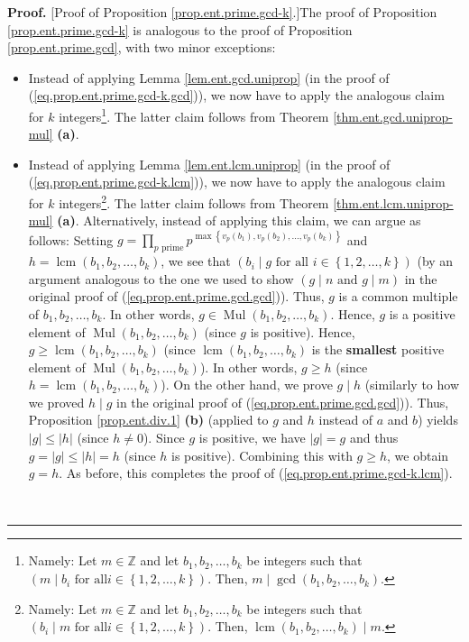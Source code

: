 \documentclass[numbers=enddot,12pt,final,onecolumn,notitlepage]{scrartcl}%
\numberwithin{exer}{subsection}
\theoremstyle{definition}
\newenvironment{proof}[1][Proof]{\noindent\textbf{#1.} }{\ \rule{0.5em}{0.5em}}
\let\prodnonlimits\prod
\renewcommand{\prod}{\prodnonlimits\limits}
\begin{document}
\begin{proof}
[Proof of Proposition \ref{prop.ent.prime.gcd-k}.]The proof of Proposition
\ref{prop.ent.prime.gcd-k} is analogous to the proof of Proposition
\ref{prop.ent.prime.gcd}, with two minor exceptions:

\begin{itemize}
\item Instead of applying Lemma \ref{lem.ent.gcd.uniprop} (in the proof of
(\ref{eq.prop.ent.prime.gcd-k.gcd})), we now have to apply the analogous claim
for $k$ integers\footnote{Namely: Let $m\in\mathbb{Z}$ and let $b_{1}%
,b_{2},\ldots,b_{k}$ be integers such that $\left(  m\mid b_{i}\text{ for all
}i\in\left\{  1,2,\ldots,k\right\}  \right)  $. Then, $m\mid\gcd\left(
b_{1},b_{2},\ldots,b_{k}\right)  $.}. The latter claim follows from Theorem
\ref{thm.ent.gcd.uniprop-mul} \textbf{(a)}.

\item Instead of applying Lemma \ref{lem.ent.lcm.uniprop} (in the proof of
(\ref{eq.prop.ent.prime.gcd-k.lcm})), we now have to apply the analogous claim
for $k$ integers\footnote{Namely: Let $m\in\mathbb{Z}$ and let $b_{1}%
,b_{2},\ldots,b_{k}$ be integers such that $\left(  b_{i}\mid m\text{ for all
}i\in\left\{  1,2,\ldots,k\right\}  \right)  $. Then, $\operatorname{lcm}%
\left(  b_{1},b_{2},\ldots,b_{k}\right)  \mid m$.}. The latter claim follows
from Theorem \ref{thm.ent.lcm.uniprop-mul} \textbf{(a)}. Alternatively,
instead of applying this claim, we can argue as follows: Setting
$g=\prod_{p\text{ prime}}p^{\max\left\{  v_{p}\left(  b_{1}\right)
,v_{p}\left(  b_{2}\right)  ,\ldots,v_{p}\left(  b_{k}\right)  \right\}  }$
and $h=\operatorname{lcm}\left(  b_{1},b_{2},\ldots,b_{k}\right)  $, we see
that $\left(  b_{i}\mid g\text{ for all }i\in\left\{  1,2,\ldots,k\right\}
\right)  $ (by an argument analogous to the one we used to show $\left(  g\mid
n\text{ and }g\mid m\right)  $ in the original proof of
(\ref{eq.prop.ent.prime.gcd.gcd})). Thus, $g$ is a common multiple of
$b_{1},b_{2},\ldots,b_{k}$. In other words, $g\in\operatorname*{Mul}\left(
b_{1},b_{2},\ldots,b_{k}\right)  $. Hence, $g$ is a positive element of
$\operatorname*{Mul}\left(  b_{1},b_{2},\ldots,b_{k}\right)  $ (since $g$ is
positive). Hence, $g\geq\operatorname{lcm}\left(  b_{1},b_{2},\ldots
,b_{k}\right)  $ (since $\operatorname{lcm}\left(  b_{1},b_{2},\ldots
,b_{k}\right)  $ is the \textbf{smallest} positive element of
$\operatorname*{Mul}\left(  b_{1},b_{2},\ldots,b_{k}\right)  $). In other
words, $g\geq h$ (since $h=\operatorname{lcm}\left(  b_{1},b_{2},\ldots
,b_{k}\right)  $). On the other hand, we prove $g\mid h$ (similarly to how we
proved $h\mid g$ in the original proof of (\ref{eq.prop.ent.prime.gcd.gcd})).
Thus, Proposition \ref{prop.ent.div.1} \textbf{(b)} (applied to $g$ and $h$
instead of $a$ and $b$) yields $\left\vert g\right\vert \leq\left\vert
h\right\vert $ (since $h\neq0$). Since $g$ is positive, we have $\left\vert
g\right\vert =g$ and thus $g=\left\vert g\right\vert \leq\left\vert
h\right\vert =h$ (since $h$ is positive). Combining this with $g\geq h$, we
obtain $g=h$. As before, this completes the proof of
(\ref{eq.prop.ent.prime.gcd-k.lcm}).
\end{itemize}
\end{proof}
\end{document}
